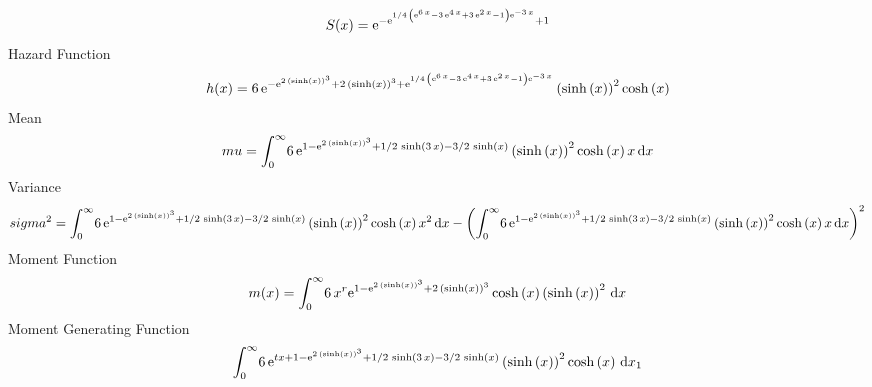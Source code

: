 \documentclass[12pt]{article}
\begin{document}
 $$ S(x)={{\rm e}^{-{{\rm e}^{1/4\, \left( {{\rm e}^{6\,x}}-3\,{{\rm e}^{4\,x}}
+3\,{{\rm e}^{2\,x}}-1 \right) {{\rm e}^{-3\,x}}}}+1}}
$$ Hazard Function 
 $$ h(x)=6\,{{\rm e}^{-{{\rm e}^{2\, \left( \sinh \left( x \right)  \right) ^{3
}}}+2\, \left( \sinh \left( x \right)  \right) ^{3}+{{\rm e}^{1/4\,
 \left( {{\rm e}^{6\,x}}-3\,{{\rm e}^{4\,x}}+3\,{{\rm e}^{2\,x}}-1
 \right) {{\rm e}^{-3\,x}}}}}} \left( \sinh \left( x \right)  \right) 
^{2}\cosh \left( x \right) 
$$Mean 
 $$ mu=\int_{0}^{\infty }\!6\,{{\rm e}^{1-{{\rm e}^{2\, \left( \sinh \left( x
 \right)  \right) ^{3}}}+1/2\,\sinh \left( 3\,x \right) -3/2\,\sinh
 \left( x \right) }} \left( \sinh \left( x \right)  \right) ^{2}\cosh
 \left( x \right) x\,{\rm d}x
$$ Variance 
 $$ sigma^2 = \int_{0}^{\infty }\!6\,{{\rm e}^{1-{{\rm e}^{2\, \left( \sinh \left( x
 \right)  \right) ^{3}}}+1/2\,\sinh \left( 3\,x \right) -3/2\,\sinh
 \left( x \right) }} \left( \sinh \left( x \right)  \right) ^{2}\cosh
 \left( x \right) {x}^{2}\,{\rm d}x- \left( \int_{0}^{\infty }\!6\,{
{\rm e}^{1-{{\rm e}^{2\, \left( \sinh \left( x \right)  \right) ^{3}}}
+1/2\,\sinh \left( 3\,x \right) -3/2\,\sinh \left( x \right) }}
 \left( \sinh \left( x \right)  \right) ^{2}\cosh \left( x \right) x
\,{\rm d}x \right) ^{2}
$$Moment Function 
 $$ m(x) = \int_{0}^{\infty }\!6\,{x}^{r}{{\rm e}^{1-{{\rm e}^{2\, \left( \sinh
 \left( x \right)  \right) ^{3}}}+2\, \left( \sinh \left( x \right) 
 \right) ^{3}}}\cosh \left( x \right)  \left( \sinh \left( x \right) 
 \right) ^{2}\,{\rm d}x
$$ Moment Generating Function 
 $$\int_{0}^{\infty }\!6\,{{\rm e}^{tx+1-{{\rm e}^{2\, \left( \sinh
 \left( x \right)  \right) ^{3}}}+1/2\,\sinh \left( 3\,x \right) -3/2
\,\sinh \left( x \right) }} \left( \sinh \left( x \right)  \right) ^{2
}\cosh \left( x \right) \,{\rm d}x_{{1}}
$$
\end{document}
